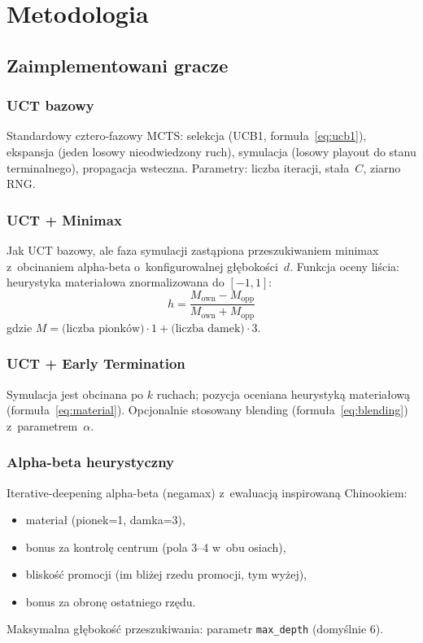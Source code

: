 \documentclass[12pt,a4paper]{article}
\begin{document}
\section{Metodologia}
\label{sec:methodology}

\subsection{Zaimplementowani gracze}

\subsubsection{UCT bazowy}
Standardowy cztero-fazowy MCTS: selekcja (UCB1, formuła~\ref{eq:ucb1}), ekspansja (jeden losowy nieodwiedzony ruch), symulacja (losowy playout do stanu terminalnego), propagacja wsteczna. Parametry: liczba iteracji, stała~$C$, ziarno RNG.

\subsubsection{UCT + Minimax}
Jak UCT bazowy, ale faza symulacji zastąpiona przeszukiwaniem minimax z~obcinaniem alpha-beta o~konfigurowalnej głębokości~$d$. Funkcja oceny liścia: heurystyka materiałowa znormalizowana do $[-1, 1]$:
\begin{equation}
  h = \frac{M_{\text{own}} - M_{\text{opp}}}{M_{\text{own}} + M_{\text{opp}}}
  \label{eq:material}
\end{equation}
gdzie $M = \text{(liczba pionków)} \cdot 1 + \text{(liczba damek)} \cdot 3$.

\subsubsection{UCT + Early Termination}
Symulacja jest obcinana po $k$ ruchach; pozycja oceniana heurystyką materiałową (formuła~\ref{eq:material}). Opcjonalnie stosowany blending (formuła~\ref{eq:blending}) z~parametrem~$\alpha$.

\subsubsection{Alpha-beta heurystyczny}
Iterative-deepening alpha-beta (negamax) z~ewaluacją inspirowaną Chinookiem:
\begin{itemize}[nosep]
  \item materiał (pionek=1, damka=3),
  \item bonus za kontrolę centrum (pola 3--4 w~obu osiach),
  \item bliskość promocji (im bliżej rzedu promocji, tym wyżej),
  \item bonus za obronę ostatniego rzędu.
\end{itemize}
Maksymalna głębokość przeszukiwania: parametr \texttt{max\_depth} (domyślnie 6).
\end{document}
